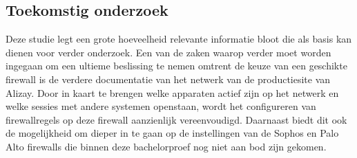\documentclass[a0,portrait]{hogent-poster}
\begin{document}
\begin{multicols}{2}
\section{Toekomstig onderzoek}

Deze studie legt een grote hoeveelheid relevante informatie bloot die als basis kan dienen voor verder onderzoek. Een van de zaken waarop verder moet worden ingegaan om een ultieme beslissing te nemen omtrent de keuze van een geschikte firewall is de verdere documentatie van het netwerk van de productiesite van Alizay. 
Door in kaart te brengen welke apparaten actief zijn op het netwerk en welke sessies met andere systemen openstaan, wordt het configureren van firewallregels op deze firewall aanzienlijk vereenvoudigd. Daarnaast biedt dit ook de mogelijkheid om dieper in te gaan op de instellingen van de Sophos en Palo Alto firewalls die binnen deze bachelorproef nog niet aan bod zijn gekomen.

 
\end{multicols}
\end{document}
